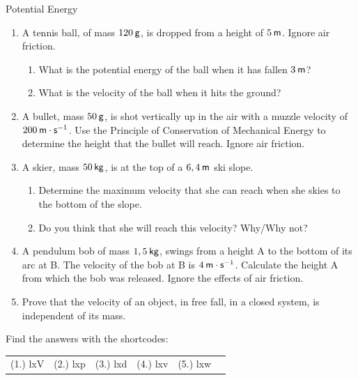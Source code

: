 \begin{exercises}{Potential Energy }
            \nopagebreak \noindent
            \label{m38786*id70623}\begin{enumerate}[noitemsep, label=\textbf{\arabic*}. ] 
            \label{m38786*uid95}\item A tennis ball, of mass $120\phantom{\rule{2pt}{0ex}}\mathsf{g}$, is dropped from a height of $5\phantom{\rule{2pt}{0ex}}\mathsf{m}$. Ignore air friction.
\label{m38786*id70639}\begin{enumerate}[noitemsep, label=\textbf{\alph*}. ] 
            \label{m38786*uid96}\item What is the potential energy of the ball when it has fallen $3\phantom{\rule{2pt}{0ex}}\mathsf{m}$?
\label{m38786*uid97}\item What is the velocity of the ball when it hits the ground?
\end{enumerate}
                \label{m38786*uid98}\item A bullet, mass $50\phantom{\rule{2pt}{0ex}}\mathsf{g}$, is shot vertically up in the air with a muzzle velocity of $200\phantom{\rule{2pt}{0ex}}\mathsf{m}\ensuremath{\cdot}\mathsf{s}{}^{-1}$. Use the Principle of Conservation of Mechanical Energy to determine the height that the bullet will reach. Ignore air friction.\newline
\label{m38786*uid99}\item A skier, mass $50\phantom{\rule{2pt}{0ex}}\mathsf{kg}$, is at the top of a $6,4\phantom{\rule{2pt}{0ex}}\mathsf{m}$ ski slope.
\label{m38786*id70721}\begin{enumerate}[noitemsep, label=\textbf{\alph*}. ] 
            \label{m38786*uid100}\item Determine the maximum velocity that she can reach when she skies to the bottom of the slope.
\label{m38786*uid101}\item Do you think that she will reach this velocity? Why/Why not?
\end{enumerate}
                \label{m38786*uid102}\item A pendulum bob of mass $1,5\phantom{\rule{2pt}{0ex}}\mathsf{kg}$, swings from a height A to the bottom of its arc at B. The velocity of the bob at B is $4\phantom{\rule{2pt}{0ex}}\mathsf{m}\ensuremath{\cdot}\mathsf{s}{}^{-1}$. Calculate the height A from which the bob was released. Ignore the effects of air friction.\newline
\label{m38786*uid103}\item Prove that the velocity of an object, in free fall, in a closed system, is independent of its mass.\newline
\end{enumerate}
    \label{m38786*cid8}
\par {} Find the answers with the shortcodes:
 \par \begin{tabular}[h]{cccccc}
 (1.) lxV  &  (2.) lxp  &  (3.) lxd  &  (4.) lxv  &  (5.) lxw  & \end{tabular}
\end{exercises}
